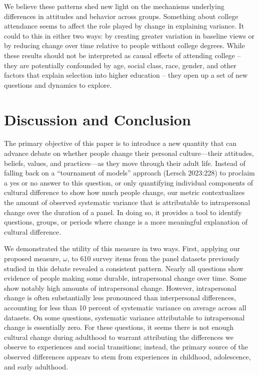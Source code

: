 \documentclass[
  11pt,
]{article}
\begin{document}
We believe these patterns shed new light on the mechanisms underlying
differences in attitudes and behavior across groups. Something about
college attendance seems to affect the role played by change in
explaining variance. It could to this in either two ways: by creating
greater variation in baseline views or by reducing change over time
relative to people without college degrees. While these results should
not be interpreted as causal effects of attending college -- they are
potentially confounded by age, social class, race, gender, and other
factors that explain selection into higher education -- they open up a
set of new questions and dynamics to explore.

\section{Discussion and Conclusion}\label{discussion-and-conclusion}

The primary objective of this paper is to introduce a new quantity that
can advance debate on whether people change their personal
culture---their attitudes, beliefs, values, and practices---as they move
through their adult life. Instead of falling back on a ``tournament of
models'' approach (Lersch 2023:228) to proclaim a yes or no answer to
this question, or only quantifying individual components of cultural
difference to show how much people change, our metric contextualizes the
amount of observed systematic variance that is attributable to
intrapersonal change over the duration of a panel. In doing so, it
provides a tool to identify questions, groups, or periods where change
is a more meaningful explanation of cultural difference.

We demonstrated the utility of this measure in two ways. First, applying
our proposed measure, \(\omega\), to 610 survey items from the panel
datasets previously studied in this debate revealed a consistent
pattern. Nearly all questions show evidence of people making some
durable, intrapersonal change over time. Some show notably high amounts
of intrapersonal change. However, intrapersonal change is often
substantially less pronounced than interpersonal differences, accounting
for less than 10 percent of systematic variance on average across all
datasets. On some questions, systematic variance attributable to
intrapersonal change is essentially zero. For these questions, it seems
there is not enough cultural change during adulthood to warrant
attributing the differences we observe to experiences and social
transitions; instead, the primary source of the observed differences
appears to stem from experiences in childhood, adolescence, and early
adulthood.
\end{document}
